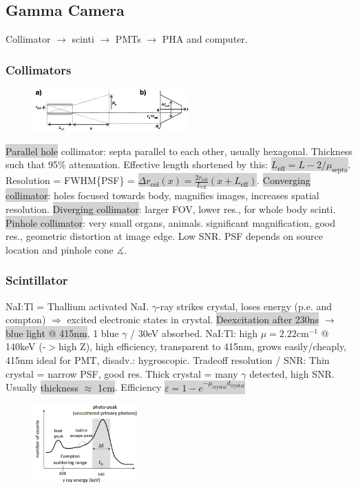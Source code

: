 \documentclass[9pt]{article}
\newcommand{\grey}[1]{\setlength{\fboxsep}{0pt}\colorbox{lightgrey}{#1}}
\begin{document}
\begin{multicols}{2}
\subsection{Gamma Camera}
Collimator $\rightarrow$ scinti $\rightarrow$ PMTs $\rightarrow$ PHA and computer.
\subsubsection{Collimators} 
\begin{figure}
	\vspace{-4mm}
	\includegraphics[width=6cm]{collimator.PNG}
\end{figure}
\grey{Parallel hole} collimator: septa parallel to each other, usually hexagonal. Thickness such that 95\% attenuation. Effective length shortened by this: \grey{$L_\mathrm{eff} = L - 2 / \mu_\mathrm{septa}$}. Resolution = FWHM\{PSF\} = \grey{$\Delta r_\mathrm{col}(x) = \frac{2r_\mathrm{col}}{L_\mathrm{eff}}(x + L_\mathrm{eff})$}.
\grey{Converging collimator}: holes focused towards body, magnifies images, increases spatial resolution.
\grey{Diverging collimator}: larger FOV, lower res., for whole body scinti.
\grey{Pinhole collimator}: very small organs, animals. significant magnification, good res., geometric distortion at image edge. Low SNR. PSF depends on source location and pinhole cone $\measuredangle$.

\subsubsection{Scintillator} NaI:Tl = Thallium activated NaI. $\gamma$-ray strikes crystal, loses energy (p.e. and compton) $\Rightarrow$ excited electronic states in crystal. \grey{Deexcitation after 230ns} $\rightarrow$ \grey{blue light @ 415nm}, 1 blue $\gamma$ / 30eV absorbed. NaI:Tl: high $\mu=2.22\mathrm{cm^{-1}}$ @ 140keV (-$>$high Z), high efficiency, transparent to 415nm, grows easily/cheaply, 415nm ideal for PMT, disadv.: hygroscopic. Tradeoff resolution / SNR: Thin crystal = narrow PSF, good res. Thick crystal = many $\gamma$ detected, high SNR. Usually \grey{thickness $\approx$ 1cm}. Efficiency \grey{$\varepsilon = 1-e^{-\mu_\mathrm{crystal}d_\mathrm{crystal}}$}

\begin{figure}
	\vspace{-4mm}
	\includegraphics[width=4cm]{nuclearImagingCurve.PNG}
\end{figure}

\end{multicols}
\end{document}
